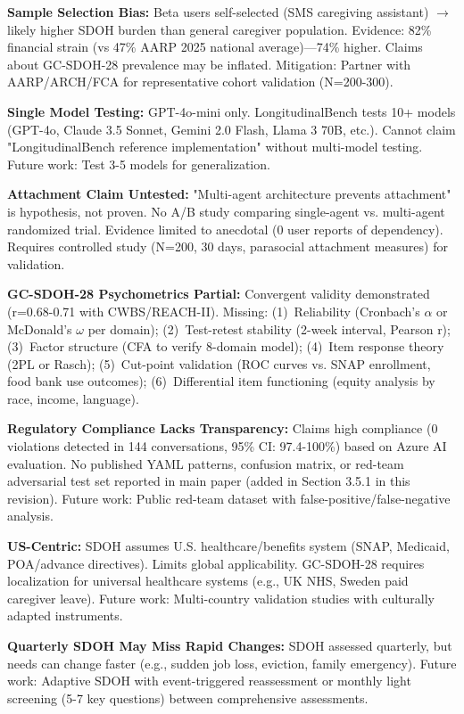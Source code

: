 \documentclass{article}
\begin{document}
\textbf{Sample Selection Bias:} Beta users self-selected (SMS caregiving assistant) $\rightarrow$ likely higher SDOH burden than general caregiver population. Evidence: 82\% financial strain (vs 47\% AARP 2025 national average)—74\% higher. Claims about GC-SDOH-28 prevalence may be inflated. Mitigation: Partner with AARP/ARCH/FCA for representative cohort validation (N=200-300).

\textbf{Single Model Testing:} GPT-4o-mini only. LongitudinalBench tests 10+ models (GPT-4o, Claude 3.5 Sonnet, Gemini 2.0 Flash, Llama 3 70B, etc.). Cannot claim "LongitudinalBench reference implementation" without multi-model testing. Future work: Test 3-5 models for generalization.

\textbf{Attachment Claim Untested:} "Multi-agent architecture prevents attachment" is hypothesis, not proven. No A/B study comparing single-agent vs. multi-agent randomized trial. Evidence limited to anecdotal (0 user reports of dependency). Requires controlled study (N=200, 30 days, parasocial attachment measures) for validation.

\textbf{GC-SDOH-28 Psychometrics Partial:} Convergent validity demonstrated (r=0.68-0.71 with CWBS/REACH-II). Missing: (1)~Reliability (Cronbach's $\alpha$ or McDonald's $\omega$ per domain); (2)~Test-retest stability (2-week interval, Pearson r); (3)~Factor structure (CFA to verify 8-domain model); (4)~Item response theory (2PL or Rasch); (5)~Cut-point validation (ROC curves vs. SNAP enrollment, food bank use outcomes); (6)~Differential item functioning (equity analysis by race, income, language).

\textbf{Regulatory Compliance Lacks Transparency:} Claims high compliance (0 violations detected in 144 conversations, 95\% CI: 97.4-100\%) based on Azure AI evaluation. No published YAML patterns, confusion matrix, or red-team adversarial test set reported in main paper (added in Section 3.5.1 in this revision). Future work: Public red-team dataset with false-positive/false-negative analysis.

\textbf{US-Centric:} SDOH assumes U.S. healthcare/benefits system (SNAP, Medicaid, POA/advance directives). Limits global applicability. GC-SDOH-28 requires localization for universal healthcare systems (e.g., UK NHS, Sweden paid caregiver leave). Future work: Multi-country validation studies with culturally adapted instruments.

\textbf{Quarterly SDOH May Miss Rapid Changes:} SDOH assessed quarterly, but needs can change faster (e.g., sudden job loss, eviction, family emergency). Future work: Adaptive SDOH with event-triggered reassessment or monthly light screening (5-7 key questions) between comprehensive assessments.
\end{document}

